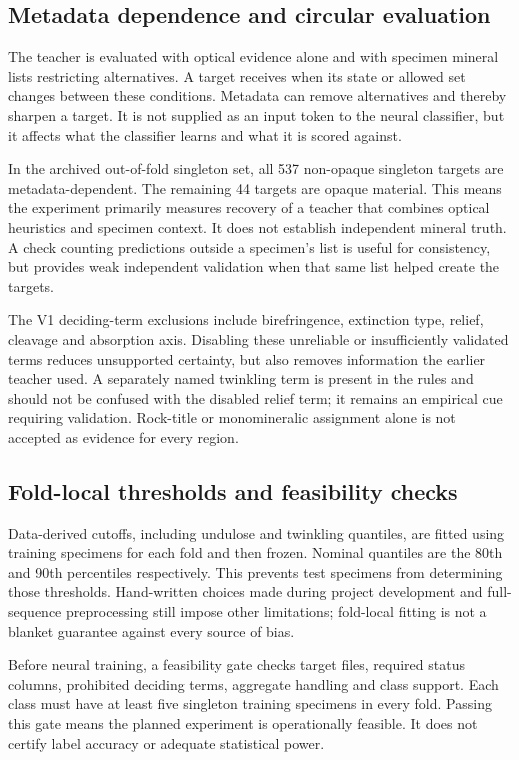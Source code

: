 \subsection{Metadata dependence and circular evaluation}
The teacher is evaluated with optical evidence alone and with specimen mineral lists restricting alternatives. A target receives  when its state or allowed set changes between these conditions. Metadata can remove alternatives and thereby sharpen a target. It is not supplied as an input token to the neural classifier, but it affects what the classifier learns and what it is scored against.

In the archived out-of-fold singleton set, all 537 non-opaque singleton targets are metadata-dependent. The remaining 44 targets are opaque material. This means the experiment primarily measures recovery of a teacher that combines optical heuristics and specimen context. It does not establish independent mineral truth. A check counting predictions outside a specimen's list is useful for consistency, but provides weak independent validation when that same list helped create the targets.

The V1 deciding-term exclusions include birefringence, extinction type, relief, cleavage and absorption axis. Disabling these unreliable or insufficiently validated terms reduces unsupported certainty, but also removes information the earlier teacher used. A separately named twinkling term is present in the rules and should not be confused with the disabled relief term; it remains an empirical cue requiring validation. Rock-title or monomineralic assignment alone is not accepted as evidence for every region.

\subsection{Fold-local thresholds and feasibility checks}
Data-derived cutoffs, including undulose and twinkling quantiles, are fitted using training specimens for each fold and then frozen. Nominal quantiles are the 80th and 90th percentiles respectively. This prevents test specimens from determining those thresholds. Hand-written choices made during project development and full-sequence preprocessing still impose other limitations; fold-local fitting is not a blanket guarantee against every source of bias.

Before neural training, a feasibility gate checks target files, required status columns, prohibited deciding terms, aggregate handling and class support. Each class must have at least five singleton training specimens in every fold. Passing this gate means the planned experiment is operationally feasible. It does not certify label accuracy or adequate statistical power.

